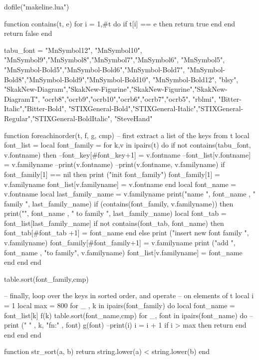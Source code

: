 \documentclass[12pt,a4paper]{article}
\author{Hong Phuc Bui}
\date{27.06.2013}
\begin{document}
\begin{luacode*}

dofile("makeline.lua")

function contains(t, e)
	for i = 1,#t do
		if t[i] == e then return true end
	end
	return false
end

tabu_font = {
"MnSymbol12", "MnSymbol10", "MnSymbol9","MnSymbol8","MnSymbol7","MnSymbol6", "MnSymbol5",
"MnSymbol-Bold5","MnSymbol-Bold6","MnSymbol-Bold7", "MnSymbol-Bold8","MnSymbol-Bold9","MnSymbol-Bold10", "MnSymbol-Bold12",
"blsy",
"SkakNew-Diagram","SkakNew-Figurine","SkakNew-Figurine","SkakNew-DiagramT",
"ocrb8","ocrb9","ocrb10","ocrb6","ocrb7","ocrb5",
"rblmi",
"Bitter-Italic","Bitter-Bold",
"STIXGeneral-Bold","STIXGeneral-Italic","STIXGeneral-Regular","STIXGeneral-BoldItalic",
"SteveHand"
}

function foreachinorder(t, f, g, cmp)
    -- first extract a list of the keys from t
    local font_list = {}
    local font_family = {}
    for k,v in ipairs(t) do
		if not contains(tabu_font, v.fontname) then
			--font_key[#font_key+1] = v.fontname
			--font_list[v.fontname] = v.familyname
			--print(v.fontname)
			--print(v.fontname, v.familyname)
			if font_family[1] == nil then
				print ("init font_family")
				font_family[1] = v.familyname
				font_list[v.familyname] = {v.fontname}
			end
			local font_name = v.fontname
			local last_family_name = v.familyname
			print("name ", font_name , " family ", last_family_name)
			if (contains(font_family, v.familyname)) then
				print("", font_name , " to family ", last_family_name)
				local font_tab = font_list[last_family_name]
				if not contains(font_tab, font_name) then
					font_tab[#font_tab +1] = font_name
				end
			else
				print ("insert new font family ", v.familyname)
				font_family[#font_family+1] = v.familyname
				print ("add ", font_name , "to family", v.familyname)
				font_list[v.familyname] = {font_name}
			end
		end
    end
    
    table.sort(font_family,cmp)
    
    -- finally, loop over the keys in sorted order, and operate
    -- on elements of t
    local i = 1
    local max = 800
    for _ , k in ipairs(font_family) do
		local font_name = font_list[k]
		f(k)
		table.sort(font_name,cmp)
		for _, font in ipairs(font_name) do
			-- print (" " , k, "fn:" , font)
			g(font)
			--print(i)
			i = i + 1
			if i > max then 
				return
			end
		end
    end
end

function str_sort(a, b)
	return string.lower(a) < string.lower(b)
end



\end{luacode*}
\end{document}
